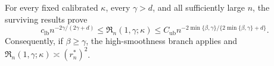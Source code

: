 For every fixed calibrated \(\kappa\), every \(\gamma>d\), and all sufficiently large \(n\), the surviving results prove
\[
c_{\mathrm{lb}}n^{-2\gamma/(2\gamma+d)}\le \mathfrak R_n(1,\gamma;\kappa)\le C_{\mathrm{ub}}n^{-2\min\{\beta,\gamma\}/\{2\min\{\beta,\gamma\}+d\}}.
\]
Consequently, if \(\beta\ge\gamma\), the high-smoothness branch applies and \(\mathfrak R_n(1,\gamma;\kappa)\asymp(r_n^*)^2\).